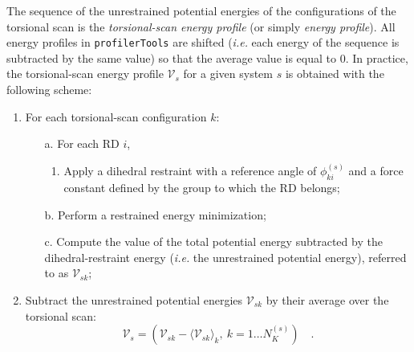 \documentclass[10pt,a4paper,openany]{memoir}
\numberwithin{equation}{section}
\newcommand{\profilertools}[0]{\texttt{profilerTools}}
\begin{document}
The sequence of the unrestrained potential energies of the
configurations of the torsional scan is the \textit{torsional-scan
  energy profile} (or simply \textit{energy profile}).  All energy
profiles in \profilertools{} are shifted (\textit{i.e.} each energy of
the sequence is subtracted by the same value) so that the average
value is equal to 0.
In practice, the torsional-scan energy profile $\mathcal{V}_s$ for a
given system $s$ is obtained with the following scheme:
\begin{enumerate}
\item For each torsional-scan configuration $k$:
  \begin{enumerate}
  \item[a.] For each RD $i$,
    \begin{enumerate}
    \item Apply a dihedral restraint with a reference angle of
      $\phi_{ki}^{(s)}$ and a force constant defined by the group to
      which the RD belongs;
  \end{enumerate}
\item [b.] Perform a restrained energy minimization;
  \item [c.] Compute the value of the total potential energy
    subtracted by the dihedral-restraint energy (\textit{i.e.} the
    unrestrained potential energy), referred to as $\mathcal{V}_{sk}$;
\end{enumerate}
\item Subtract the unrestrained potential energies
  $\mathcal{V}_{sk}$ by their average over the torsional scan:
  \begin{equation}
  \label{eq:ga-tors-scan}
  \mathcal{V}_s = \left( \mathcal{V}_{sk} - \langle {\mathcal{V}_{sk} \rangle_k},\ k=1\ldots N_K^{(s)} \right) \quad .
\end{equation}
\end{enumerate}
\end{document}
